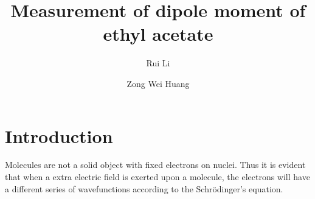 \documentclass[%
 reprint,
 amsmath,amssymb,
 aps,
10.5pt,
]{revtex4-1}
\newcommand{\sch}{Schr\"odinger}
\begin{document}

\title{Measurement of dipole moment of ethyl acetate}%

\author{Rui Li}
%


\author{Zong Wei Huang}
%



\maketitle

\section{Introduction}
Molecules are not a solid object with fixed electrons on nuclei. Thus it is evident that when a extra electric field is exerted upon a molecule, the electrons will have a different series of wavefunctions according to the \sch's equation. 
\end{document}
